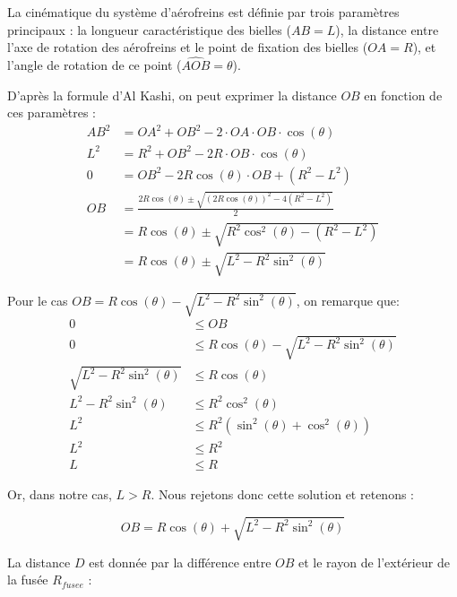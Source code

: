 \vfill

La cinématique du système d'aérofreins est définie par trois paramètres principaux : la longueur caractéristique des bielles
($AB = L$), la distance entre l'axe de rotation des aérofreins et le point de fixation des bielles ($OA = R$), et l'angle de
rotation de ce point ($\widehat{AOB}=\theta$).\\

\vfill

D'après la formule d'Al Kashi, on peut exprimer la distance $OB$ en fonction de ces paramètres :
\begin{align}
    AB^2    &= OA^2 + OB^2 - 2 \cdot OA \cdot OB \cdot \cos(\theta) \\
    L^2     &= R^2 + OB^2 - 2 R \cdot OB \cdot \cos(\theta) \\
    0       &= OB^2 - 2 R \cos(\theta) \cdot OB + (R^2 - L^2) \\
    OB      &= \frac{2 R \cos(\theta) \pm \sqrt{(2 R \cos(\theta))^2 - 4 (R^2 - L^2)}}{2} \\
            &= R \cos(\theta) \pm \sqrt{R^2 \cos^2(\theta) - (R^2 - L^2)} \\
            &= R \cos(\theta) \pm \sqrt{L^2 - R^2 \sin^2(\theta)}
\end{align}

\vfill

\newpage

Pour le cas $OB = R \cos(\theta) - \sqrt{L^2 - R^2 \sin^2(\theta)}$, on remarque que:
\begin{align}
    0 &\leq OB\\
    0 &\leq R \cos(\theta) - \sqrt{L^2 - R^2 \sin^2(\theta)}\\
    \sqrt{L^2 - R^2 \sin^2(\theta)} &\leq R \cos(\theta) \\
    L^2 - R^2 \sin^2(\theta) &\leq R^2 \cos^2(\theta) \\
    L^2 &\leq R^2 (\sin^2(\theta) + \cos^2(\theta)) \\
    L^2 &\leq R^2 \\
    L &\leq R
\end{align}

Or, dans notre cas, $L > R$. Nous rejetons donc cette solution et retenons :

\begin{equation}
    OB = R \cos(\theta) + \sqrt{L^2 - R^2 \sin^2(\theta)}
\end{equation}

La distance $D$ est donnée par la différence entre $OB$ et le rayon de l'extérieur de la fusée $R_{fusee}$ :


